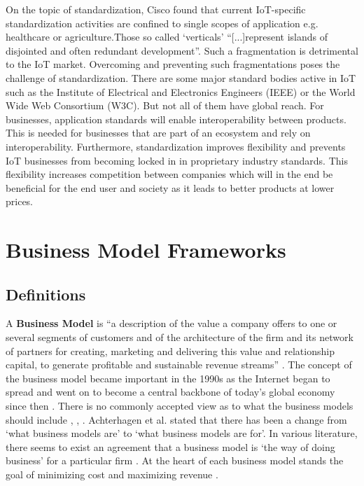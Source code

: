 			
			On the topic of standardization, Cisco found that current IoT-specific standardization activities are confined to single scopes of application e.g. healthcare or agriculture.Those so called `verticals' ``[...]represent islands of disjointed and often redundant development''\cite[p.18]{cisco}. Such a fragmentation is detrimental to the IoT market. Overcoming and preventing such fragmentations poses the challenge of standardization. There are some major standard bodies active in IoT such as the Institute of Electrical and Electronics Engineers (IEEE) or the World Wide Web Consortium (W3C). But not all of them have global reach. For businesses, application standards will enable interoperability between products. This is needed for businesses that are part of an ecosystem and rely on interoperability. Furthermore, standardization improves flexibility and prevents IoT businesses from becoming locked in in proprietary industry standards. This flexibility increases competition between companies which will in the end be beneficial for the end user and society as it leads to better products at lower prices.
		

\section{Business Model Frameworks}
\label{sec:bmf}	
	\subsection{Definitions} 
		 A \textbf{Business Model} is ``a description of the value a company offers to one or several segments of customers and of the architecture of the firm and its network of partners for creating, marketing and delivering this value and relationship capital, to generate profitable and sustainable revenue streams'' \cite{osterwalder2005}. The concept of the business model became important in the 1990s as the Internet began to spread and went on to become a central backbone of today's global economy since then \cite{zott}. There is no commonly accepted view as to what the business models should include \cite{morris}, \cite{osterwalder2005}, \cite{schweizer}. Achterhagen et al. \cite{achtenhagen} stated that there has been a change from `what business models are' to `what business models are for'. In various literature, there seems to exist an agreement that a business model is `the way of doing business' for a particular firm \cite{westerlund}. At the heart of each business model stands the goal of minimizing cost and maximizing revenue \cite{ju}.


